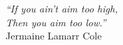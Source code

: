 \cleardoublepage
\thispagestyle{plain}

\vspace*{8cm}

\begin{flushright}
  \textsl{``If you ain't aim too high, \\
    Then you aim too low.''}\\
\vspace*{1.5cm}
    Jermaine Lamarr Cole
\end{flushright}


